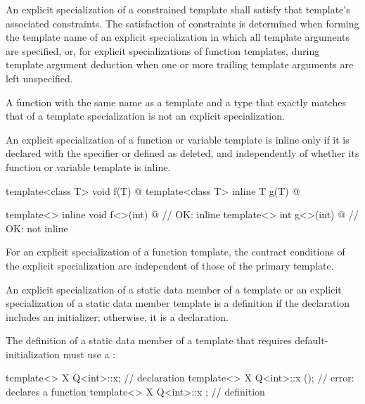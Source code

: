 \pnum
\begin{note}
An explicit specialization of a constrained template
shall satisfy that template's associated constraints.
The satisfaction of constraints is determined
when forming the template name of an explicit specialization
in which all template arguments are specified,
or, for explicit specializations of function templates,
during template argument deduction
when one or more trailing template arguments are left unspecified.
\end{note}

\pnum
A function with the same name as a template and a type that exactly matches that
of a template specialization is not an explicit specialization.

\pnum
An explicit specialization of a function or variable template is inline
only if it is declared with the 
specifier or defined as deleted, and independently of whether its
function or variable template is inline.
\begin{example}

\begin{codeblock}
template<class T> void f(T) { @\commentellip@ }
template<class T> inline T g(T) { @\commentellip@ }

template<> inline void f<>(int) { @\commentellip@ }   // OK: inline
template<> int g<>(int) { @\commentellip@ }           // OK: not inline
\end{codeblock}
\end{example}

\pnum
\begin{note}
For an explicit specialization of a function template,
the contract conditions
of the explicit specialization
are independent of those of the primary template.
\end{note}

\pnum
An explicit specialization of a static data member of a template
or an explicit specialization of a static data member template is a
definition if the declaration includes an initializer;
otherwise, it is a declaration.
\begin{note}
The definition of a static data member of a template
that requires default-initialization must use a :

\begin{codeblock}
template<> X Q<int>::x;                         // declaration
template<> X Q<int>::x ();                      // error: declares a function
template<> X Q<int>::x { };                     // definition
\end{codeblock}
\end{note}

